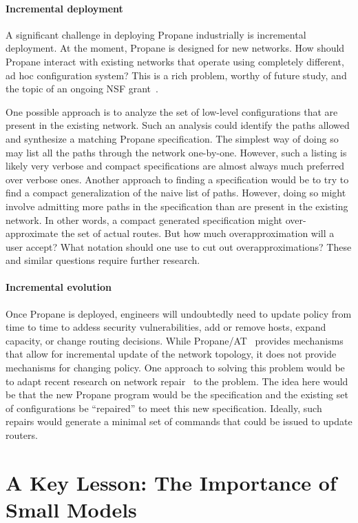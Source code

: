 \documentclass[sigconf]{acmart}
\begin{document}
\paragraph*{Incremental deployment}  A significant challenge in
deploying Propane industrially is incremental deployment. 
At the moment, Propane is designed for new
networks. How should Propane interact
with existing networks that operate using completely different, ad
hoc configuration system?  This is a rich problem, worthy of future
study, and the topic of an ongoing NSF grant~\cite{nsf-propane}.

One possible approach is to analyze the set of
low-level configurations that are present in the existing
network.  Such an analysis could identify the paths allowed and
synthesize a matching Propane specification.  The simplest way of
doing so may list all the paths through the network one-by-one.
However, such a listing is likely very verbose and compact specifications
are almost always much preferred over verbose ones.  Another approach to
finding a specification would be to try to find a compact
generalization of the naive list of paths.  However, doing so might involve
admitting more paths in the specification than are present in the
existing network.  In other words, a compact generated specification
might over-approximate the set of actual routes.  But how much
overapproximation will a user accept?  What notation should one use
to cut out overapproximations?  These and similar questions
require further research.  

\paragraph*{Incremental evolution}
Once Propane is deployed, engineers will undoubtedly need to update
policy from time to time to addess security vulnerabilities, add or
remove hosts, expand capacity, or change routing decisions.  While
Propane/AT~\cite{abstract-propane} provides mechanisms that allow for
incremental update of the network topology, it does not provide mechanisms for
changing policy.  One approach to solving this problem would be to
adapt recent research on network repair~\cite{Gember-Jacobson:SOSP17}
to the problem.  The idea here would be that the new Propane
program would be the specification and the existing set of
configurations be ``repaired'' to meet this new specification.
Ideally, such repairs would generate a minimal set of commands that
could be issued to update routers.

\section{A Key Lesson:  The Importance of Small Models}
\label{sec:conclusions}
\end{document}
